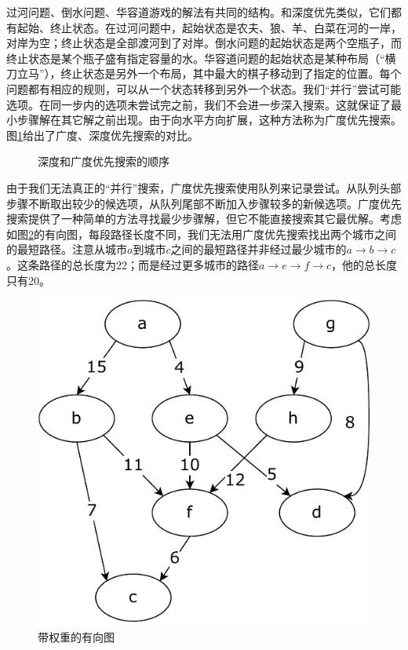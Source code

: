 \documentclass[b5paper]{ctexart}
\begin{document}
 
过河问题、倒水问题、华容道游戏的解法有共同的结构。和深度优先类似，它们都有起始、终止状态。在过河问题中，起始状态是农夫、狼、羊、白菜在河的一岸，对岸为空；终止状态是全部渡河到了对岸。倒水问题的起始状态是两个空瓶子，而终止状态是某个瓶子盛有指定容量的水。华容道问题的起始状态是某种布局（“横刀立马”），终止状态是另外一个布局，其中最大的棋子移动到了指定的位置。每个问题都有相应的规则，可以从一个状态转移到另外一个状态。我们“并行”尝试可能选项。在同一步内的选项未尝试完之前，我们不会进一步深入搜索。这就保证了最小步骤解在其它解之前出现。由于向水平方向扩展，这种方法称为广度优先搜索。图\ref{fig:dfs-bfs-tree}给出了广度、深度优先搜索的对比。

\begin{figure}[htbp]
 \centering
 \caption{深度和广度优先搜索的顺序}
 \label{fig:dfs-bfs-tree}
\end{figure}

由于我们无法真正的“并行”搜索，广度优先搜索使用队列来记录尝试。从队列头部步骤不断取出较少的候选项，从队列尾部不断加入步骤较多的新候选项。广度优先搜索提供了一种简单的方法寻找最少步骤解，但它不能直接搜索其它最优解。考虑如图\ref{fig:weighted-dag}的有向图，每段路径长度不同，我们无法用广度优先搜索找出两个城市之间的最短路径。注意从城市$a$到城市$c$之间的最短路径并非经过最少城市的$a \to b \to c$。这条路径的总长度为22；而是经过更多城市的路径$a \to e \to f \to c$，他的总长度只有20。

\begin{figure}[htbp]
 \centering
 \includegraphics[scale=0.5]{img/weighted-dag}
 \caption{带权重的有向图}
 \label{fig:weighted-dag}
\end{figure}
\end{document}
